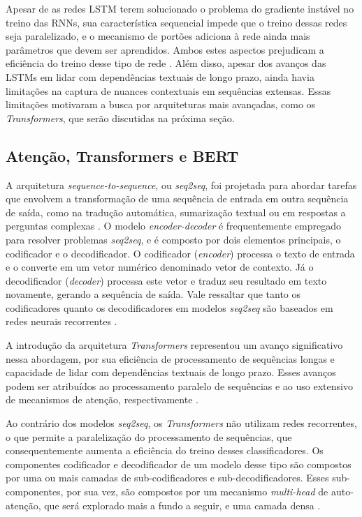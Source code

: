 \documentclass[
	12pt, oneside, a4paper, english, brazil
]{abntex2ppgsi}
\begin{document}
Apesar de as redes LSTM terem solucionado o problema do gradiente instável no treino das RNNs, sua característica sequencial impede que o treino dessas redes seja paralelizado, e o mecanismo de portões adiciona à rede  ainda mais parâmetros que devem ser aprendidos. Ambos estes aspectos prejudicam a eficiência do treino desse tipo de rede \cite{pln2023}. Além disso, apesar dos avanços das LSTMs em lidar com dependências textuais de longo prazo, ainda havia limitações na captura de nuances contextuais em sequências extensas. Essas limitações motivaram a busca por arquiteturas mais avançadas, como os {\em Transformers}, que serão discutidas na próxima seção.

\subsection{Atenção, Transformers e BERT}
\label{sec:bert}

A arquitetura {\em sequence-to-sequence}, ou {\em seq2seq}, foi projetada para abordar tarefas que envolvem a transformação de uma sequência de entrada em outra sequência de saída, como na tradução automática, sumarização textual ou em respostas a perguntas complexas \cite{pln2023}. O modelo {\em encoder-decoder} é frequentemente empregado para resolver problemas {\em seq2seq}, e é composto por dois elementos principais, o codificador e o decodificador. O codificador ({\em encoder}) processa o texto de entrada e o converte em um vetor numérico denominado vetor de contexto. Já o decodificador ({\em decoder}) processa este vetor e traduz seu resultado em texto novamente, gerando a sequência de saída. Vale ressaltar que tanto os codificadores quanto os decodificadores em modelos {\em seq2seq} são baseados em redes neurais recorrentes \cite{pln2023}.

A introdução da arquitetura {\em Transformers} representou um avanço significativo nessa abordagem, por sua eficiência de processamento de sequências longas e capacidade de lidar com dependências textuais de longo prazo. Esses avanços podem ser atribuídos ao processamento paralelo de sequências e ao uso extensivo de mecanismos de atenção, respectivamente \cite{pln2023}. 

Ao contrário dos modelos {\em seq2seq}, os {\em Transformers} não utilizam redes recorrentes, o que permite a paralelização do processamento de sequências, que consequentemente aumenta a eficiência do treino desses classificadores. Os componentes codificador e decodificador de um modelo desse tipo são compostos por uma ou mais camadas de sub-codificadores e sub-decodificadores. Esses sub-componentes, por sua vez, são compostos por um mecanismo {\em multi-head} de auto-atenção, que será explorado mais a fundo a seguir, e uma camada densa \cite{pln2023}.
\end{document}
